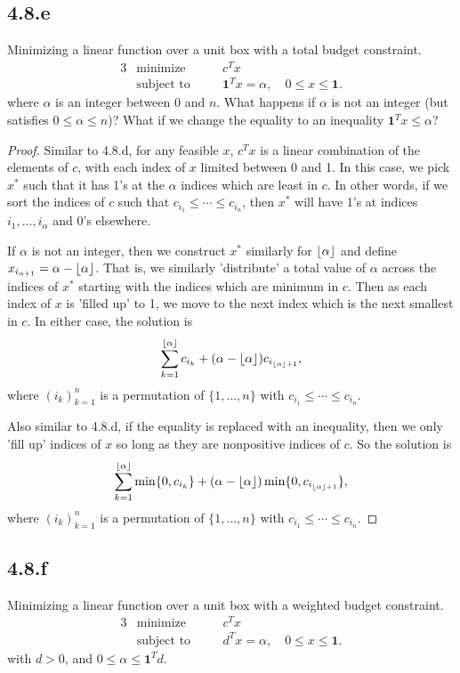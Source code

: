 \documentclass[12pt]{article}
\DeclarePairedDelimiter\floor{\lfloor}{\rfloor}
\begin{document}
\subsection*{4.8.e}
Minimizing a linear function over a unit box with a total budget constraint.
\begin{alignat*}{3}
    &\text{minimize}    &\quad& c^Tx \\
    &\text{subject to}  &\quad& \textbf{1}^Tx=\alpha, \quad 0\leq x \leq \textbf{1}.
\end{alignat*}
where $\alpha$ is an integer between $0$ and $n$. What happens if $\alpha$ is not an integer (but satisfies $0\leq\alpha\leq n$)? What if we change the equality to an inequality $\textbf{1}^Tx\leq\alpha$?

\begin{proof}
    Similar to 4.8.d, for any feasible $x$, $c^Tx$ is a linear combination of the elements of $c$, with each index of $x$ limited between 0 and 1. In this case, we pick $x^*$ such that it has 1's at the $\alpha$ indices which are least in $c$. In other words, if we sort the indices of $c$ such that $c_{i_1}\leq\cdots\leq c_{i_n}$, then $x^*$ will have 1's at indices $i_1,\dots,i_\alpha$ and 0's elsewhere. 

    If $\alpha$ is not an integer, then we construct $x^*$ similarly for $\floor{\alpha}$ and define $x_{i_{\alpha+1}}=\alpha-\floor{\alpha}$. That is, we similarly 'distribute' a total value of $\alpha$ across the indices of $x^*$ starting with the indices which are minimum in $c$. Then as each index of $x$ is 'filled up' to 1, we move to the next index which is the next smallest in $c$. In either case, the solution is
    \[\sum_{k=1}^{\floor{\alpha}}c_{i_k} + (\alpha - \floor{\alpha})c_{i_{\floor{\alpha}+1}},\]
    where $(i_k)_{k=1}^n$ is a permutation of $\{1,\dots,n\}$ with $c_{i_1}\leq\cdots\leq c_{i_n}$.
    
    Also similar to 4.8.d, if the equality is replaced with an inequality, then we only 'fill up' indices of $x$ so long as they are nonpositive indices of $c$. So the solution is
    \[\sum_{k=1}^{\floor{\alpha}}\min\{0,c_{i_k}\} + (\alpha - \floor{\alpha})\min\{0,c_{i_{\floor{\alpha}+1}}\},\]
    where $(i_k)_{k=1}^n$ is a permutation of $\{1,\dots,n\}$ with $c_{i_1}\leq\cdots\leq c_{i_n}$.
\end{proof}


\subsection*{4.8.f}
Minimizing a linear function over a unit box with a weighted budget constraint.
\begin{alignat*}{3}
    &\text{minimize}    &\quad& c^Tx \\
    &\text{subject to}  &\quad& d^Tx=\alpha, \quad 0\leq x \leq \textbf{1}.
\end{alignat*}
with $d>0$, and $0\leq\alpha\leq\textbf{1}^Td$.
\end{document}
